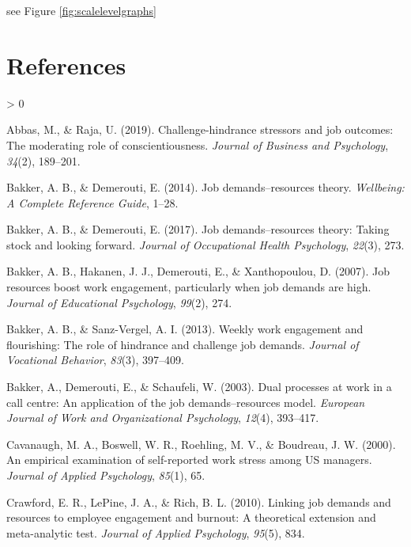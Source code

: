 \documentclass[
  english,
  man]{apa6}
\newlength{\cslhangindent}
\newenvironment{CSLReferences}[2] %
 {%
  \setlength{\parindent}{0pt}
  \ifodd #1 \everypar{\setlength{\hangindent}{\cslhangindent}}\ignorespaces\fi
  \ifnum #2 > 0
  \setlength{\parskip}{#2\baselineskip}
  \fi
 }%
 {}
\begin{document}
see Figure \ref{fig:scalelevelgraphs}

\newpage

\hypertarget{references}{%
\section{References}\label{references}}

\begingroup
\setlength{\parindent}{-0.5in}
\setlength{\leftskip}{0.5in}

\hypertarget{refs}{}
\begin{CSLReferences}{1}{0}
\leavevmode\hypertarget{ref-abbas2019challenge}{}%
Abbas, M., \& Raja, U. (2019). Challenge-hindrance stressors and job outcomes: The moderating role of conscientiousness. \emph{Journal of Business and Psychology}, \emph{34}(2), 189--201.

\leavevmode\hypertarget{ref-bakker2014job}{}%
Bakker, A. B., \& Demerouti, E. (2014). Job demands--resources theory. \emph{Wellbeing: A Complete Reference Guide}, 1--28.

\leavevmode\hypertarget{ref-bakker2017job}{}%
Bakker, A. B., \& Demerouti, E. (2017). Job demands--resources theory: Taking stock and looking forward. \emph{Journal of Occupational Health Psychology}, \emph{22}(3), 273.

\leavevmode\hypertarget{ref-bakker2007job}{}%
Bakker, A. B., Hakanen, J. J., Demerouti, E., \& Xanthopoulou, D. (2007). Job resources boost work engagement, particularly when job demands are high. \emph{Journal of Educational Psychology}, \emph{99}(2), 274.

\leavevmode\hypertarget{ref-bakker2013weekly}{}%
Bakker, A. B., \& Sanz-Vergel, A. I. (2013). Weekly work engagement and flourishing: The role of hindrance and challenge job demands. \emph{Journal of Vocational Behavior}, \emph{83}(3), 397--409.

\leavevmode\hypertarget{ref-bakker2003dual}{}%
Bakker, A., Demerouti, E., \& Schaufeli, W. (2003). Dual processes at work in a call centre: An application of the job demands--resources model. \emph{European Journal of Work and Organizational Psychology}, \emph{12}(4), 393--417.

\leavevmode\hypertarget{ref-cavanaugh2000empirical}{}%
Cavanaugh, M. A., Boswell, W. R., Roehling, M. V., \& Boudreau, J. W. (2000). An empirical examination of self-reported work stress among US managers. \emph{Journal of Applied Psychology}, \emph{85}(1), 65.

\leavevmode\hypertarget{ref-crawford2010linking}{}%
Crawford, E. R., LePine, J. A., \& Rich, B. L. (2010). Linking job demands and resources to employee engagement and burnout: A theoretical extension and meta-analytic test. \emph{Journal of Applied Psychology}, \emph{95}(5), 834.


\end{CSLReferences}
\end{document}
